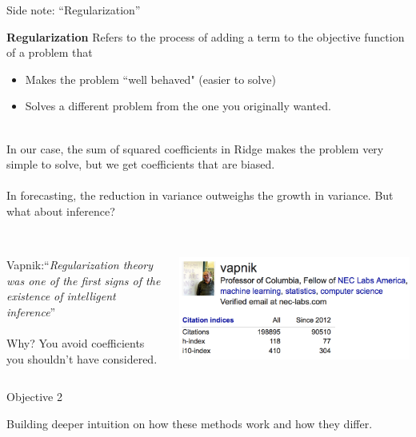 \documentclass[mathserif, aspectratio=169]{beamer}
\begin{document}
\begin{frame}{Side note:  ``Regularization''}

\textbf{Regularization} Refers to the process of adding a term to the objective function of a problem that 
\begin{itemize}
\item Makes the problem ``well behaved" (easier to solve)
\item Solves a different problem from the one you originally wanted.\\~\\
\end{itemize}

In our case, the sum of squared coefficients in Ridge makes the problem very simple to solve, but we get coefficients that are biased.\\~\\

In forecasting, the reduction in variance outweighs the growth in variance.  But what about inference? \\~\\

\pause

\begin{columns}

Vapnik:``\textit{Regularization theory was one of the first signs of the existence of intelligent inference}''\\~\\

Why?  You avoid coefficients you shouldn't have considered.

\includegraphics[scale=0.4]{vapnik}
\end{columns}
\end{frame}


\begin{frame}{Objective 2}

Building deeper intuition on how these methods work and how they differ.  
\end{frame}
\end{document}
